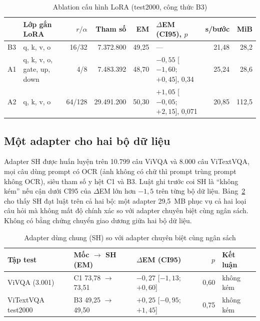 \begin{table}[htbp]
\caption{Ablation cấu hình LoRA (test2000, công thức B3)}
\label{tab:res-lora}
\centering
\footnotesize
\begin{tabular}{p{}p{}rrrp{}rr}
\toprule
\raggedright \textbf{} & \raggedright \textbf{Lớp gắn LoRA} & \raggedright \textbf{$r/\alpha$} & \raggedright \textbf{Tham số} & \raggedright \textbf{EM} & \raggedright \textbf{$\Delta$EM (CI95), $p$} & \raggedright \textbf{s/bước} & \raggedright \textbf{MiB} \tabularnewline
\midrule
\raggedright B3 & \raggedright q, k, v, o & \raggedright 16/32 & \raggedright 7.372.800 & \raggedright 49,25 & \raggedright --- & \raggedright 21,48 & \raggedright 28,2 \tabularnewline
\raggedright A1 & \raggedright q, k, v, o, gate, up, down & \raggedright 4/8 & \raggedright 7.483.392 & \raggedright 48,70 & \raggedright $-0{,}55$ [$-1{,}60$; $+0{,}45$], 0,34 & \raggedright 25,24 & \raggedright 28,6 \tabularnewline
\raggedright A2 & \raggedright q, k, v, o & \raggedright 64/128 & \raggedright 29.491.200 & \raggedright 50,30 & \raggedright $+1{,}05$ [$-0{,}05$; $+2{,}15$], 0,071 & \raggedright 20,85 & \raggedright 112,5 \tabularnewline
\bottomrule
\end{tabular}
\end{table}

\subsection{Một adapter cho hai bộ dữ liệu}
\label{sec:res-sh}

Adapter SH được huấn luyện trên 10.799 câu ViVQA và 8.000 câu ViTextVQA, mọi câu
dùng prompt có OCR (ảnh không có chữ thì prompt trùng prompt không OCR), siêu tham
số y hệt C1 và B3. Luật ghi trước coi SH là ``không kém'' nếu cận dưới CI95 của
$\Delta$EM lớn hơn $-1{,}5$ trên từng bộ dữ liệu. Bảng~\ref{tab:res-sh} cho thấy
SH đạt luật trên cả hai bộ: một adapter 29,5~MB phục vụ cả hai loại câu hỏi mà
không mất độ chính xác so với adapter chuyên biệt cùng ngân sách. Không có bằng
chứng chuyển giao dương giữa hai bộ dữ liệu.

\begin{table}[htbp]
\caption{Adapter dùng chung (SH) so với adapter chuyên biệt cùng ngân sách}
\label{tab:res-sh}
\centering
\small
\begin{tabular}{p{}p{}p{}rp{}}
\toprule
\raggedright \textbf{Tập test} & \raggedright \textbf{Mốc $\to$ SH (EM)} & \raggedright \textbf{$\Delta$EM (CI95)} & \raggedright \textbf{$p$} & \raggedright \textbf{Kết luận} \tabularnewline
\midrule
\raggedright ViVQA (3.001) & \raggedright C1 73,78 $\to$ 73,51 & \raggedright $-0{,}27$ [$-1{,}13$; $+0{,}60$] & \raggedright 0,60 & \raggedright không kém \tabularnewline
\raggedright ViTextVQA test2000 & \raggedright B3 49,25 $\to$ 49,50 & \raggedright $+0{,}25$ [$-0{,}95$; $+1{,}45$] & \raggedright 0,75 & \raggedright không kém \tabularnewline
\bottomrule
\end{tabular}
\end{table}


